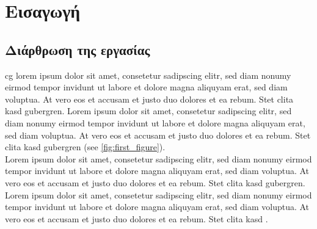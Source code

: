\section{Εισαγωγή}\label{sec:introduction}

\subsection{Διάρθρωση της εργασίας}
\noindent
\gls{cg} lorem ipsum dolor sit amet, consetetur sadipscing elitr, sed diam nonumy eirmod tempor invidunt ut labore et dolore magna aliquyam erat, sed diam voluptua. At vero eos et accusam et justo duo dolores et ea rebum. Stet clita kasd gubergren. Lorem ipsum dolor sit amet, consetetur sadipscing elitr, sed diam nonumy eirmod tempor invidunt ut labore et dolore magna aliquyam erat, sed diam voluptua. At vero eos et accusam et justo duo dolores et ea rebum. Stet clita kasd gubergren (see  \cref{fig:first_figure}).\\

\noindent
Lorem ipsum dolor sit amet, consetetur sadipscing elitr, sed diam nonumy eirmod tempor invidunt ut labore et dolore magna aliquyam erat, sed diam voluptua. At vero eos et accusam et justo duo dolores et ea rebum. Stet clita kasd gubergren. Lorem ipsum dolor sit amet, consetetur sadipscing elitr, sed diam nonumy eirmod tempor invidunt ut labore et dolore magna aliquyam erat, sed diam voluptua. At vero eos et accusam et justo duo dolores et ea rebum. Stet clita kasd \cite{McBoatfaceLorem2001}. 

